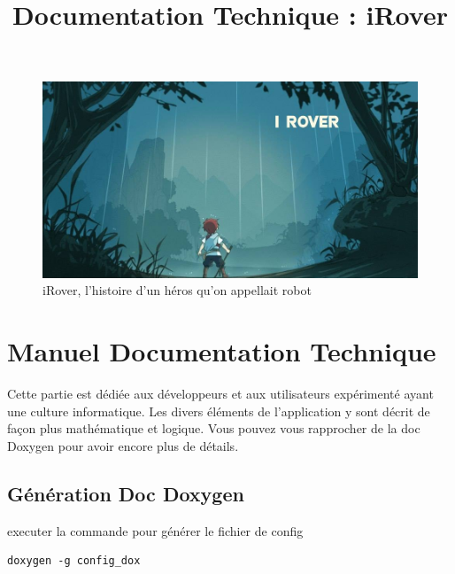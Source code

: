 \documentclass[a4paper,12pts]{article}
\title{Documentation Technique : iRover}
\author{}
\newenvironment{DDbox}[1]{
\begin{lrbox}{\BBbox}\begin{minipage}{\linewidth}}
{\end{minipage}\end{lrbox}\noindent\colorbox{Zgris}{\usebox{\BBbox}} \\
[.5cm]}
\begin{document}
\maketitle


\begin{figure}[h]
   \includegraphics[width=350pt]{Illustration/proj_irover.jpg}
	\caption{iRover, l'histoire d'un héros qu'on appellait robot}
\end{figure}



\newpage


\renewcommand{\contentsname}{Sommaire} 
\tableofcontents

\newpage





\section{Manuel Documentation Technique}


\vspace{2cm}

Cette partie est dédiée aux développeurs et aux utilisateurs expérimenté ayant une culture informatique.
Les divers éléments de l'application y sont décrit de façon plus mathématique et logique.
Vous pouvez vous rapprocher de la doc Doxygen pour avoir encore plus de détails.

\subsection{Génération Doc Doxygen}

executer la commande pour générer le fichier de config

\vspace{0.5 cm}
\begin{DDbox}{\linewidth}
\begin{verbatim}
doxygen -g config_dox
\end{verbatim}
\end{DDbox}
\end{document}
